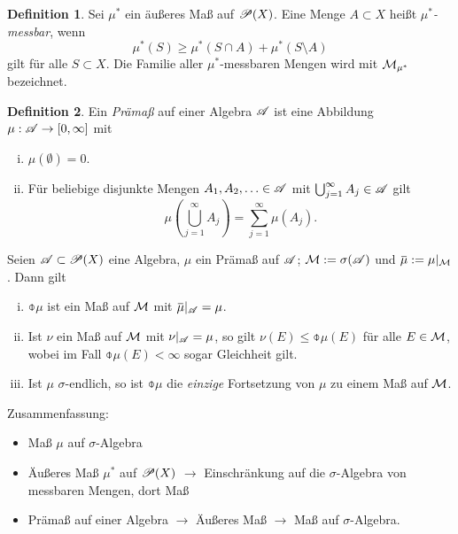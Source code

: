 \documentclass[
 a4paper,
 10pt,
 parskip=half
 ]{scrartcl}
\theoremstyle{plain}
\theoremstyle{definition}
\newtheorem*{defn}{Definition}
\numberwithin{equation}{section}
\begin{document}
\begin{defn}
 Sei $\mu^*$ ein äußeres Maß auf $\mathscr{P}(X)$. Eine Menge $A \subset X$ heißt \emph{$\mu^*$-messbar}, wenn
 \[ \mu^*(S) \ge \mu^*( S \cap A ) + \mu^*( S \setminus A ) \]
 gilt für alle $S \subset X$. Die Familie aller $\mu^*$-messbaren Mengen wird mit $\mathcal{M}_{\mu^*}$ bezeichnet.
\end{defn}

\begin{defn}
 Ein \emph{Prämaß} auf einer Algebra $\mathscr{A}$ ist eine Abbildung $\mu: \mathscr{A} \to [0, \infty]$ mit 
 \begin{enumerate}[(i)]
  \item $\mu(\emptyset) = 0$.
  \item Für beliebige disjunkte Mengen $A_1, A_2, \ldots \in \mathscr{A}$ mit $\bigcup_{j=1}^\infty A_j \in \mathscr{A}$ gilt
   \[ \mu \left( \bigcup_{j=1}^\infty A_j \right) = \sum_{j=1}^\infty \mu( A_j ). \]
 \end{enumerate}
\end{defn}

\begin{thm}
 Seien $\mathscr{A} \subset \mathscr{P}(X)$ eine Algebra, $\mu$ ein Prämaß auf $\mathscr{A}$; $\mathcal{M} := \sigma(\mathscr{A})$ und $\obar{\mu} := \mu|_\meas$. Dann gilt
 \begin{enumerate}[(i)]
  \item $\obar{\mu}$ ist ein Maß auf $\mathcal{M}$ mit $\obar{\mu}|_\mA = \mu$.
  \item Ist $\nu$ ein Maß auf $\mathcal{M}$ mit $\nu |_{\mathscr{A}} = \mu$, so gilt $\nu(E) \le \obar{\mu}(E)$ für alle $E \in \mathcal{M}$, wobei im Fall $\obar{\mu}(E) < \infty$ sogar Gleichheit gilt.
  \item Ist $\mu$ $\sigma$-endlich, so ist $\obar{\mu}$ die \emph{einzige} Fortsetzung von $\mu$ zu einem Maß auf $\mathcal{M}$.
 \end{enumerate}
\end{thm}

Zusammenfassung:
\begin{itemize}
\item Maß $\mu$ auf $\sigma$-Algebra
\item Äußeres Maß $\mu^*$ auf $\mathscr{P}(X)$ $\rightarrow$ Einschränkung auf die
  $\sigma$-Algebra von messbaren Mengen, dort Maß 
\item Prämaß auf einer Algebra $\rightarrow$ Äußeres Maß $\rightarrow$ Maß auf
  $\sigma$-Algebra.
\end{itemize}

\clearpage
\end{document}

